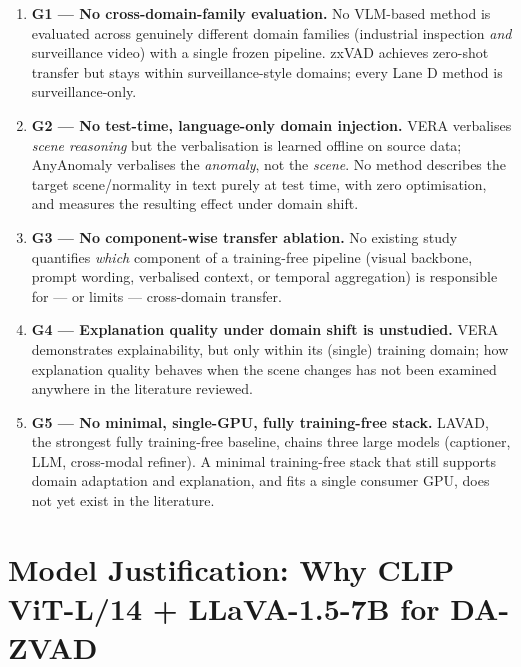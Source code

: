 \documentclass[12pt, a4paper]{article}
\begin{document}
\begin{enumerate}[leftmargin=1.6em, itemsep=0.5em]
    \item \textbf{G1 --- No cross-domain-family evaluation.} No VLM-based
    method is evaluated across genuinely different domain families
    (industrial inspection \textit{and} surveillance video) with a single
    frozen pipeline. zxVAD achieves zero-shot transfer but stays within
    surveillance-style domains; every Lane D method is surveillance-only.

    \item \textbf{G2 --- No test-time, language-only domain injection.} VERA
    verbalises \textit{scene reasoning} but the verbalisation is learned
    offline on source data; AnyAnomaly verbalises the \textit{anomaly}, not
    the \textit{scene}. No method describes the target scene/normality in
    text purely at test time, with zero optimisation, and measures the
    resulting effect under domain shift.

    \item \textbf{G3 --- No component-wise transfer ablation.} No existing
    study quantifies \textit{which} component of a training-free pipeline
    (visual backbone, prompt wording, verbalised context, or temporal
    aggregation) is responsible for --- or limits --- cross-domain transfer.

    \item \textbf{G4 --- Explanation quality under domain shift is
    unstudied.} VERA demonstrates explainability, but only within its
    (single) training domain; how explanation quality behaves when the
    scene changes has not been examined anywhere in the literature reviewed.

    \item \textbf{G5 --- No minimal, single-GPU, fully training-free
    stack.} LAVAD, the strongest fully training-free baseline, chains three
    large models (captioner, LLM, cross-modal refiner). A minimal
    training-free stack that still supports domain adaptation and
    explanation, and fits a single consumer GPU, does not yet exist in the
    literature.
\end{enumerate}

\section{Model Justification: Why CLIP ViT-L/14 + LLaVA-1.5-7B for DA-ZVAD}
\end{document}
